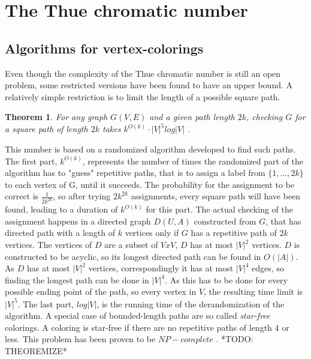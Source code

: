 \documentclass[12pt,a4paper]{article}
\newtheorem{theorem}{Theorem}
\begin{document}
\section{The Thue chromatic number}
\subsection{Algorithms for vertex-colorings}

Even though the complexity of the Thue chromatic number is still an open problem, some restricted versions have been found to have an upper bound. A relatively simple restriction is to limit the length of a possible square path.
\begin{theorem} 
For any graph $G(V, E)$ and a given path length $2k$, checking $G$ for a square path of length $2k$ takes $k^{O(k)} \cdot |V|^5 log |V|$ \citep{Marx2009}.
\end{theorem} 
This number is based on a randomized algorithm developed to find such paths. The first part, $k^{O(k)}$, represents the number of times the randomized part of the algorithm has to "guess" repetitive paths, that is to assign a label from $\{ 1, ..., 2k \}$ to each vertex of G, until it succeeds. The probability for the assignment to be correct is $\frac{1}{2k^{2k}}$, so after trying $2k^{2k}$ assignments, every square path will have been found, leading to a duration of $k^{O(k)}$ for this part. The actual checking of the assignment happens in a directed graph $D(U, A)$ constructed from $G$, that has directed path with a length of $k$ vertices only if $G$ has a repetitive path of $2k$ vertices. The vertices of $D$ are a subset of $V x V$, $D$ has at most $|V|^2$ vertices. $D$ is constructed to be acyclic, so its longest directed path can be found in $O(|A|)$. As $D$ has at most $|V|^2$ vertices, correspondingly it has at most $|V|^4$ edges, so finding the longest path can be done in $|V|^4$. As this has to be done for every possible ending point of the path, so every vertex in $V$, the resulting time limit is $|V|^5$. The last part, $log |V|$, is the running time of the derandomization of the algorithm. 
\newline
A special case of bounded-length paths are so called \textit{star-free} colorings. A coloring is star-free if there are no repetitive paths of length 4 or less. This problem has been proven to be $NP-complete$ \citep{Coleman1984}.
\newline
\newline
*TODO: THEOREMIZE*
\newline
\end{document}

